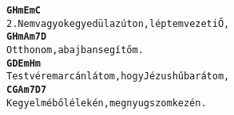 \newpage
{}
\kottastart
{}
\kottaend
\begin{minipage}{\textwidth}
\begin{alltt}
\textbf{    G                    Hm     Em           C}
2. Nem vagyok egyedül az úton, léptem vezeti Ő,
\textbf{   G            Hm         Am7  D}
   Otthonom, a bajban segítőm.
\textbf{    G               D           Em           Hm}
   Testvérem arcán látom, hogy Jézus hű barátom,
\textbf{    C          G         Am7           D7}
   Kegyelméből élek én, megnyugszom kezén.
\end{alltt}
\vspace{0.0cm}
\versszakspacing
\end{minipage}
